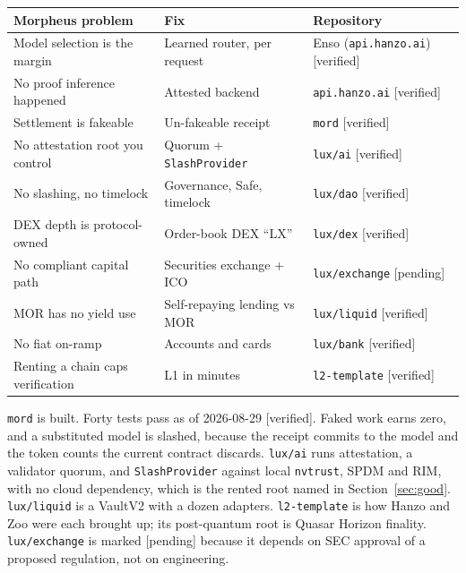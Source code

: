\documentclass[11pt,a4paper]{article}
\newcommand{\code}[1]{\texttt{\small #1}}
\begin{document}
\begin{center}
\begin{tabular}{@{}lll@{}}
\toprule
\textbf{Morpheus problem} & \textbf{Fix} & \textbf{Repository} \\
\midrule
Model selection is the margin        & Learned router, per request        & Enso (\code{api.hanzo.ai}) [verified] \\
No proof inference happened          & Attested backend                   & \code{api.hanzo.ai} [verified] \\
Settlement is fakeable               & Un-fakeable receipt                & \code{mord} [verified] \\
No attestation root you control      & Quorum + \code{SlashProvider}      & \code{lux/ai} [verified] \\
No slashing, no timelock             & Governance, Safe, timelock         & \code{lux/dao} [verified] \\
DEX depth is protocol-owned          & Order-book DEX ``LX''              & \code{lux/dex} [verified] \\
No compliant capital path            & Securities exchange + ICO          & \code{lux/exchange} [pending] \\
MOR has no yield use                 & Self-repaying lending vs MOR       & \code{lux/liquid} [verified] \\
No fiat on-ramp                      & Accounts and cards                 & \code{lux/bank} [verified] \\
Renting a chain caps verification    & L1 in minutes                      & \code{l2-template} [verified] \\
\bottomrule
\end{tabular}
\end{center}

\noindent
\code{mord} is built. Forty tests pass as of 2026-08-29 [verified]. Faked work
earns zero, and a substituted model is slashed, because the receipt commits to
the model and the token counts the current contract discards.
\code{lux/ai} runs attestation, a validator quorum, and \code{SlashProvider}
against local \code{nvtrust}, SPDM and RIM, with no cloud dependency, which is
the rented root named in Section~\ref{sec:good}. \code{lux/liquid} is a VaultV2
with a dozen adapters. \code{l2-template} is how Hanzo and Zoo were each brought
up; its post-quantum root is Quasar Horizon finality. \code{lux/exchange} is
marked [pending] because it depends on SEC approval of a proposed regulation, not
on engineering.
\end{document}
